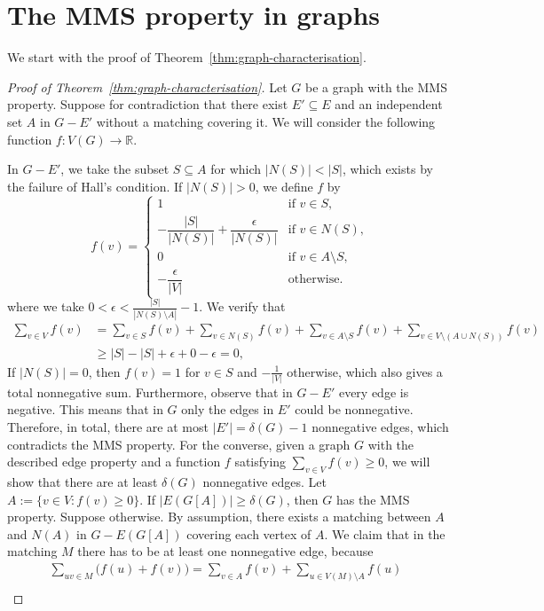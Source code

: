 \documentclass[12pt,UKenglish]{amsart}
\theoremstyle{plain}
\theoremstyle{definition}
\theoremstyle{remark}
\begin{document}
\section{The MMS property in graphs}\label{sec:mms-graphs}
We start with the proof of Theorem~\ref{thm:graph-characterisation}.
\begin{proof}[Proof of Theorem~\ref{thm:graph-characterisation}]
 Let $G$ be a graph with the MMS property.
 Suppose for contradiction that there exist $E'\subseteq E$ and an independent set $A$ in $G-E'$ without a matching covering it.
 We will consider the following function $f:V(G)\rightarrow \mathbb{R}$.
 
  In $G-E'$, we take the subset $S\subseteq A$ for which $|N(S)|<|S|$, which exists by the failure of Hall's condition.
 If $|N(S)|>0$, we define $f$ by
 \[f(v)=\begin{cases}
   1 & \text{if } v\in S, \\
   -\dfrac{|S|}{|N(S)|}+\dfrac{\epsilon}{|N(S)|} & \text{if } v\in N(S), \\
   0 & \text{if } v\in A\setminus S, \\
   -\dfrac{\epsilon}{|V|} & \text{otherwise.}
   \end{cases}\]
where we take $0<\epsilon<\frac{|S|}{|N(S)\setminus A|}-1$.
 We verify that
   \begin{align*}     
   \sum_{v\in V}f(v)&=\sum_{v\in S}f(v)+\sum_{v\in N(S)}f(v)+\sum_{v\in A\setminus S }f(v)+\sum_{v\in V\setminus(A\cup N(S))}f(v)   \\ 
   &\ge|S|-|S|+\epsilon+0-\epsilon=0,
   \end{align*}
   If $|N(S)|=0$, then $f(v)=1$ for $v\in S$ and $-\frac{1}{|V|}$ otherwise, which also gives a total nonnegative sum.
 Furthermore, observe that in $G-E'$ every edge is negative.
 This means that in $G$ only the edges in $E'$ could be nonnegative.
 Therefore, in total, there are at most $|E'|=\delta(G)-1$ nonnegative edges, which contradicts the MMS property.
 For the converse, given a graph $G$ with the described edge property and a function $f$ satisfying $\sum_{v\in V} f(v)\ge0$, we will show that there are at least $\delta(G)$ nonnegative edges.
 Let $A:=\{v\in V : f(v)\ge 0\}$. If $|E(G[A])|\ge \delta(G)$, then $G$ has the MMS property. Suppose otherwise.
 By assumption, there exists a matching between $A$ and $N(A)$ in $G-E(G[A])$ covering each vertex of $A$.
 We claim that in the matching $M$ there has to be at least one nonnegative edge, because
 \begin{align*}
 \sum_{uv\in M}\bigl(f(u)+f(v)\bigr)=\sum_{v\in A}f(v)+\sum_{u\in V(M)\setminus A}f(u)&\\

\end{align*}
\end{proof}
\end{document}
